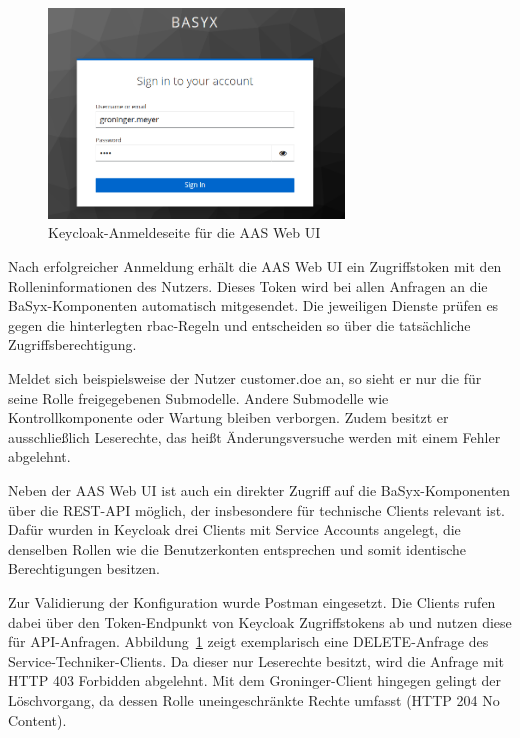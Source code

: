 \begin{figure}[htbp]
    \centering
        \includegraphics[width=0.7\textwidth]{Bilder/Ergebnisse/DPP/KeycloakAnmeldeSeite.png}
    \caption{Keycloak-Anmeldeseite für die AAS Web UI}
    \label{fig:KeycloakAnmeldeSeite}
\end{figure}

Nach erfolgreicher Anmeldung erhält die AAS Web UI ein Zugriffstoken mit den Rolleninformationen des Nutzers.
Dieses Token wird bei allen Anfragen an die BaSyx-Komponenten automatisch mitgesendet.
Die jeweiligen Dienste prüfen es gegen die hinterlegten \acs{rbac}-Regeln und entscheiden so über die tatsächliche Zugriffsberechtigung.

Meldet sich beispielsweise der Nutzer customer.doe an, so sieht er nur die für seine Rolle freigegebenen Submodelle. 
Andere Submodelle wie Kontrollkomponente oder Wartung bleiben verborgen. 
Zudem besitzt er ausschließlich Leserechte, das heißt Änderungsversuche werden mit einem Fehler abgelehnt.

Neben der AAS Web UI ist auch ein direkter Zugriff auf die BaSyx-Komponenten über die REST-API möglich, der insbesondere für technische Clients relevant ist. 
Dafür wurden in Keycloak drei Clients mit Service Accounts angelegt, die denselben Rollen wie die Benutzerkonten entsprechen und somit identische Berechtigungen besitzen.

Zur Validierung der Konfiguration wurde Postman eingesetzt. 
Die Clients rufen dabei über den Token-Endpunkt von Keycloak Zugriffstokens ab und nutzen diese für API-Anfragen. 
Abbildung~\ref{fig:KeycloakAnmeldeSeite} zeigt exemplarisch eine DELETE-Anfrage des Service-Techniker-Clients. 
Da dieser nur Leserechte besitzt, wird die Anfrage mit HTTP 403 Forbidden abgelehnt. 
Mit dem Groninger-Client hingegen gelingt der Löschvorgang, da dessen Rolle uneingeschränkte Rechte umfasst (HTTP 204 No Content).

